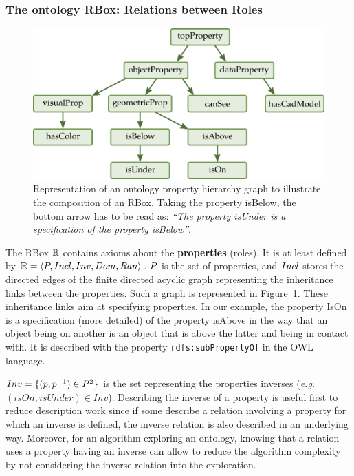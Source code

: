 \subsubsection{The ontology RBox: Relations between Roles}

\begin{figure}[ht!]
\centering
\includegraphics[scale=0.4]{figures/chapter2/Rbox.png}
\caption{\label{fig:Rbox} Representation of an ontology property hierarchy graph to illustrate the composition of an RBox. Taking the property isBelow, the bottom arrow has to be read as: \textit{``The property isUnder is a specification of the property isBelow''}.}
\end{figure}

The RBox $\mathbb{R}$ contains axioms about the \textbf{properties} (roles). It is at least defined by $\mathbb{R} = \langle P, Incl, Inv, Dom, Ran \rangle$. $P$ is the set of properties, and $Incl$ stores the directed edges of the finite directed acyclic graph representing the inheritance links between the properties. Such a graph is represented in Figure~\ref{fig:Rbox}. These inheritance links aim at specifying properties. In our example, the property IsOn is a specification (more detailed) of the property isAbove in the way that an object being on another is an object that is above the latter and being in contact with. It is described with the property \verb|rdfs:subPropertyOf| in the OWL language. 

$Inv = \{(p, p^{-1}) \in P^2\}$ is the set representing the properties inverses (\textit{e.g.} $(isOn, isUnder) \in Inv$). Describing the inverse of a property is useful first to reduce description work since if some describe a relation involving a property for which an inverse is defined, the inverse relation is also described in an underlying way. Moreover, for an algorithm exploring an ontology, knowing that a relation uses a property having an inverse can allow to reduce the algorithm complexity by not considering the inverse relation into the exploration.

